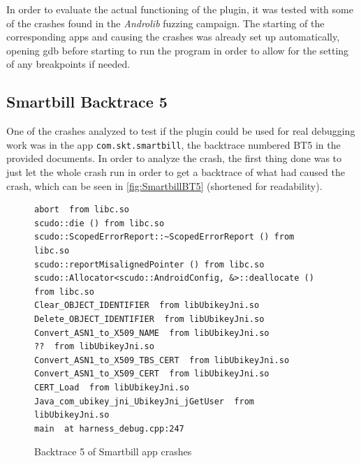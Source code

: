 \documentclass[a4paper,11pt,oneside]{report}
\begin{document}
In order to evaluate the actual functioning of the plugin, it was tested with
some of the crashes found in the \textit{Androlib} fuzzing campaign. 
The starting of the corresponding
apps and causing the crashes was already set up automatically, opening gdb
before starting to run the program in order to allow for the setting of any
breakpoints if needed.

\subsection{Smartbill Backtrace 5}

One of the crashes analyzed to test if the plugin could be used for real
debugging work was in the app \verb|com.skt.smartbill|, the backtrace numbered
BT5 in the provided documents. In order to analyze the crash, the first thing
done was to just let the whole crash run in order to get a backtrace of what
had caused the crash, which can be seen in \autoref{fig:SmartbillBT5}
(shortened for readability).

\begin{figure}[h!]
  \centering
\begin{verbatim}
abort  from libc.so
scudo::die () from libc.so
scudo::ScopedErrorReport::~ScopedErrorReport () from libc.so
scudo::reportMisalignedPointer () from libc.so
scudo::Allocator<scudo::AndroidConfig, &>::deallocate () from libc.so
Clear_OBJECT_IDENTIFIER  from libUbikeyJni.so
Delete_OBJECT_IDENTIFIER  from libUbikeyJni.so
Convert_ASN1_to_X509_NAME  from libUbikeyJni.so
??  from libUbikeyJni.so
Convert_ASN1_to_X509_TBS_CERT  from libUbikeyJni.so
Convert_ASN1_to_X509_CERT  from libUbikeyJni.so
CERT_Load  from libUbikeyJni.so
Java_com_ubikey_jni_UbikeyJni_jGetUser  from libUbikeyJni.so
main  at harness_debug.cpp:247
\end{verbatim}
  \caption{Backtrace 5 of Smartbill app crashes}
  \label{fig:SmartbillBT5}
\end{figure}
\end{document}
